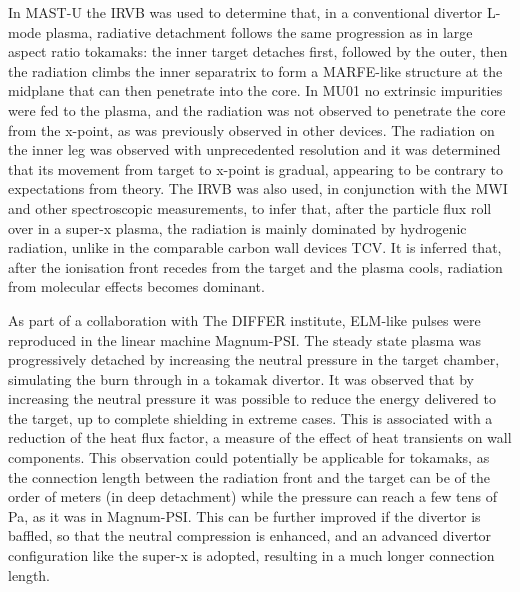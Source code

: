 \documentclass[]{yorkThesis}  %
\begin{document}
In MAST-U the IRVB was used to determine that, in a conventional divertor L-mode plasma, radiative detachment follows the same progression as in large aspect ratio tokamaks: the inner target detaches first, followed by the outer, then the radiation climbs the inner separatrix to form a MARFE-like structure at the midplane that can then penetrate into the core. In MU01 no extrinsic impurities were fed to the plasma, and the radiation was not observed to penetrate the core from the x-point, as was previously observed in other devices.\cite{Wiesen2017} The radiation on the inner leg was observed with unprecedented resolution and it was determined that its movement from target to x-point is gradual, appearing to be contrary to expectations from theory.\cite{Lipschultz2016} The IRVB was also used, in conjunction with the MWI and other spectroscopic measurements, to infer that, after the particle flux roll over in a super-x plasma, the radiation is mainly dominated by hydrogenic radiation, unlike in the comparable carbon wall devices TCV. It is inferred that, after the ionisation front recedes from the target and the plasma cools, radiation from molecular effects becomes dominant.


As part of a collaboration with The DIFFER institute, ELM-like pulses were reproduced in the linear machine Magnum-PSI. The steady state plasma was progressively detached by increasing the neutral pressure in the target chamber, simulating the burn through in a tokamak divertor. It was observed that by increasing the neutral pressure it was possible to reduce the energy delivered to the target, up to complete shielding in extreme cases. This is associated with a reduction of the heat flux factor, a measure of the effect of heat transients on wall components. This observation could potentially be applicable for tokamaks, as the connection length between the radiation front and the target can be of the order of meters (in deep detachment) while the pressure can reach a few tens of Pa, as it was in Magnum-PSI. This can be further improved if the divertor is baffled, so that the neutral compression is enhanced, and an advanced divertor configuration like the super-x is adopted, resulting in a much longer connection length.
\end{document}
